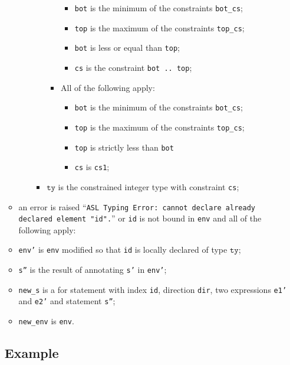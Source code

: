\documentclass{book}
\newcommand\tty[0]{\texttt{ty}}
\begin{document}
\begin{itemize}
\begin{itemize}
\begin{itemize}
\begin{itemize}
\begin{itemize}
                 \begin{itemize}
                   \item \texttt{bot} is the minimum of the constraints \texttt{bot\_cs};
                   \item \texttt{top} is the maximum of the constraints \texttt{top\_cs};
                   \item \texttt{bot} is less or equal than \texttt{top};
                   \item \texttt{cs} is the constraint \texttt{bot .. top};
                 \end{itemize}
               \item All of the following apply:
                 \begin{itemize}
                   \item \texttt{bot} is the minimum of the constraints \texttt{bot\_cs};
                   \item \texttt{top} is the maximum of the constraints \texttt{top\_cs};
                   \item \texttt{top} is strictly less than \texttt{bot}
                   \item \texttt{cs} is \texttt{cs1};
                 \end{itemize}
             \end{itemize}
           \item $\tty$ is the constrained integer type with constraint \texttt{cs};
         \end{itemize}
     \end{itemize}
   \item an error is raised ``\texttt{ASL Typing Error: cannot declare already \\ declared element "id".}'' or \texttt{id} is not bound in \texttt{env} and all of the following apply:
   \item \texttt{env'} is \texttt{env} modified so that \texttt{id} is locally declared of type $\tty$;
   \item \texttt{s''} is the result of annotating \texttt{s'} in \texttt{env'};
   \item \texttt{new\_s} is a for statement with index \texttt{id}, direction \texttt{dir}, two expressions \texttt{e1'} and \texttt{e2'} and statement \texttt{s''};
   \item \texttt{new\_env} is \texttt{env}.
   \end{itemize}

  \subsection{Example}



\end{itemize}
\end{document}
